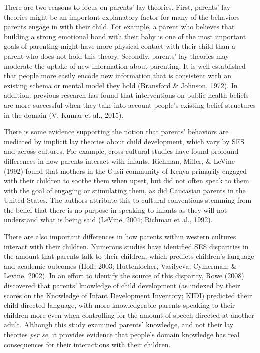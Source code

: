 \documentclass[10pt, letterpaper]{article}
\begin{document}
There are two reasons to focus on parents' lay theories. First, parents'
lay theories might be an important explanatory factor for many of the
behaviors parents engage in with their child. For example, a parent who
believes that building a strong emotional bond with their baby is one of
the most important goals of parenting might have more physical contact
with their child than a parent who does not hold this theory. Secondly,
parents' lay theories may moderate the uptake of new information about
parenting. It is well-established that people more easily encode new
information that is consistent with an existing schema or mental model
they hold (Bransford \& Johnson, 1972). In addition, previous research
has found that interventions on public health beliefs are more
successful when they take into account people's existing belief
structures in the domain (V. Kumar et al., 2015).

There is some evidence supporting the notion that parents' behaviors are
mediated by implicit lay theories about child development, which vary by
SES and across cultures. For example, cross-cultural studies have found
profound differences in how parents interact with infants. Richman,
Miller, \& LeVine (1992) found that mothers in the Gusii community of
Kenya primarily engaged with their children to soothe them when upset,
but did not often speak to them with the goal of engaging or stimulating
them, as did Caucasian parents in the United States. The authors
attribute this to cultural conventions stemming from the belief that
there is no purpose in speaking to infants as they will not understand
what is being said (LeVine, 2004; Richman et al., 1992).

There are also important differences in how parents within western
cultures interact with their children. Numerous studies have identified
SES disparities in the amount that parents talk to their children, which
predicts children's language and academic outcomes (Hoff, 2003;
Huttenlocher, Vasilyeva, Cymerman, \& Levine, 2002). In an effort to
identify the source of this disparity, Rowe (2008) discovered that
parents' knowledge of child development (as indexed by their scores on
the Knowledge of Infant Development Inventory; KIDI) predicted their
child-directed language, with more knowledgeable parents speaking to
their children more even when controlling for the amount of speech
directed at another adult. Although this study examined parents'
knowledge, and not their lay theories \emph{per se}, it provides
evidence that people's domain knowledge has real consequences for their
interactions with their children.
\end{document}
